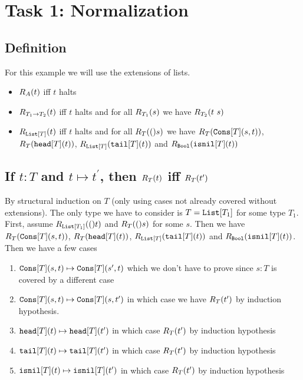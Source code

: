 \documentclass{article}
\newcommand{\rpred}[2]{\ensuremath R_{#1}(#2)}
\newcommand{\tyfun}[2]{\ensuremath #1 \rightarrow #2}
\newcommand{\tylist}[1]{\ensuremath \mathtt{List}[#1]}
\newcommand{\cons}[3]{\ensuremath \mathtt{Cons}[#1](#2,#3)}
\newcommand{\isnil}[2]{\ensuremath \mathtt{isnil}[#1](#2)}
\newcommand{\head}[2]{\ensuremath \mathtt{head}[#1](#2)}
\newcommand{\tail}[2]{\ensuremath \mathtt{tail}[#1](#2)}
\newcommand{\tybool}{\ensuremath\mathtt{Bool}}
\begin{document}
\section*{Task 1: Normalization}

\subsection*{Definition}
For this example we will use the extensions of lists.

\begin{itemize}
\item $\rpred{A}{t}$ iff $t$ halts
\item $\rpred{\tyfun{T_1}{T_2}}{t}$ iff $t$ halts and for all $\rpred{T_1}{s}$ we have $\rpred{T_2}{t\ s}$
\item $\rpred{\tylist{T}}{t}$ iff $t$ halts and for all $\rpred{T}(s)$ we have $\rpred{T}{\cons{T}{s}{t}}$, $\rpred{T}{\head{T}{t}}$, $\rpred{\tylist{T}}{\tail{T}{t}}$ and $\rpred{\tybool}{\isnil{T}{t}}$
\end{itemize}

\subsection*{If $t:T$ and $t\mapsto t^{\prime}$, then $\rpred{T}{t}$ iff $\rpred{T}{t^{\prime}}$}

By structural induction on $T$ (only using cases not already covered without extensions).
The only type we have to consider is $T=\tylist{T_1}$ for some type $T_1$. 
First, assume $\rpred{\tylist{T_1}}(t)$ and $\rpred{T}(s)$ for some $s$. Then we have $\rpred{T}{\cons{T}{s}{t}}$, $\rpred{T}{\head{T}{t}}$, $\rpred{\tylist{T}}{\tail{T}{t}}$ and $\rpred{\tybool}{\isnil{T}{t}}$.
Then we have a few cases 
\begin{enumerate}
\item $\cons{T}{s}{t} \mapsto \cons{T}{s^{\prime}}{t}$ which we don't have to prove since $s:T$ is covered by a different case 
\item $\cons{T}{s}{t} \mapsto \cons{T}{s}{t^{\prime}}$ in which case we have $\rpred{T}{t^{\prime}}$ by induction hypothesis.
\item $\head{T}{t} \mapsto \head{T}{t^{\prime}}$ in which case $\rpred{T}{t^{\prime}}$  by induction hypothesis
\item $\tail{T}{t} \mapsto \tail{T}{t^{\prime}}$ in which case $\rpred{T}{t^{\prime}}$ by induction hypothesis
\item $\isnil{T}{t} \mapsto \isnil{T}{t^{\prime}}$ in which case $\rpred{T}{t^{\prime}}$ by induction hypothesis
\end{enumerate}
\end{document}

